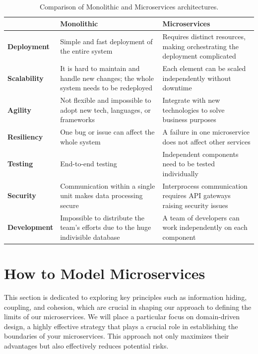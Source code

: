 \begin{table}
    \centering
    \begin{tabular}{|l|p{5cm}|p{5cm}|}
        \hline
        \textbf{}            & \textbf{Monolithic}                                                                    & \textbf{Microservices}                                                       \\ \hline
        \textbf{Deployment}  & Simple and fast deployment of the entire system                                        & Requires distinct resources, making orchestrating the deployment complicated \\ \hline
        \textbf{Scalability} & It is hard to maintain and handle new changes; the whole system needs to be redeployed & Each element can be scaled independently without downtime                    \\ \hline
        \textbf{Agility}     & Not flexible and impossible to adopt new tech, languages, or frameworks                & Integrate with new technologies to solve business purposes                   \\ \hline
        \textbf{Resiliency}  & One bug or issue can affect the whole system                                           & A failure in one microservice does not affect other services                 \\ \hline
        \textbf{Testing}     & End-to-end testing                                                                     & Independent components need to be tested individually                        \\ \hline
        \textbf{Security}    & Communication within a single unit makes data processing secure                        & Interprocess communication requires API gateways raising security issues     \\ \hline
        \textbf{Development} & Impossible to distribute the team’s efforts due to the huge indivisible database       & A team of developers can work independently on each component                \\ \hline
    \end{tabular}
    \caption{Comparison of Monolithic and Microservices architectures\textsuperscript{\cite{monoliths_avenga}}.}
    \label{tab:micro_vs_mono}
\end{table}

\section{How to Model Microservices}
This section is dedicated to exploring key principles such as information hiding, coupling, and
cohesion, which are crucial in shaping our approach to defining the limits of our microservices. We
will place a particular focus on domain-driven design, a highly effective strategy that plays a
crucial role in establishing the boundaries of your microservices. This approach not only maximizes
their advantages but also effectively reduces potential risks.

